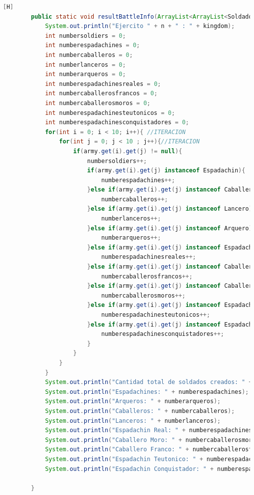 \documentclass{article}
\begin{document}
	\begin{lstlisting}[language=java,caption={Las lineas de codigos de la clase Mapa}][H]
		public static void resultBattleInfo(ArrayList<ArrayList<Soldado>> army, String kingdom, int n){
			System.out.println("Ejercito " + n + " : " + kingdom);
			int numbersoldiers = 0;
			int numberespadachines = 0;
			int numbercaballeros = 0;
			int numberlanceros = 0;
			int numberarqueros = 0;
			int numberespadachinesreales = 0;
			int numbercaballerosfrancos = 0;
			int numbercaballerosmoros = 0;
			int numberespadachinesteutonicos = 0;
			int numberespadachinesconquistadores = 0;
			for(int i = 0; i < 10; i++){ //ITERACION
				for(int j = 0; j < 10 ; j++){//ITERACION
					if(army.get(i).get(j) != null){
						numbersoldiers++;
						if(army.get(i).get(j) instanceof Espadachin){
							numberespadachines++;
						}else if(army.get(i).get(j) instanceof Caballero){
							numbercaballeros++;
						}else if(army.get(i).get(j) instanceof Lancero){
							numberlanceros++;
						}else if(army.get(i).get(j) instanceof Arquero){
							numberarqueros++;
						}else if(army.get(i).get(j) instanceof EspadachinReal){
							numberespadachinesreales++;
						}else if(army.get(i).get(j) instanceof CaballeroFranco){
							numbercaballerosfrancos++;
						}else if(army.get(i).get(j) instanceof CaballeroMoro){
							numbercaballerosmoros++;
						}else if(army.get(i).get(j) instanceof EspadachinTeutonico){
							numberespadachinesteutonicos++;
						}else if(army.get(i).get(j) instanceof EspadachinConquistador){
							numberespadachinesconquistadores++;
						}
					}
				}
			}
			System.out.println("Cantidad total de soldados creados: " + numbersoldiers);
			System.out.println("Espadachines: " + numberespadachines);
			System.out.println("Arqueros: " + numberarqueros);
			System.out.println("Caballeros: " + numbercaballeros);
			System.out.println("Lanceros: " + numberlanceros);
			System.out.println("Espadachin Real: " + numberespadachinesreales);
			System.out.println("Caballero Moro: " + numbercaballerosmoros);
			System.out.println("Caballero Franco: " + numbercaballerosfrancos);
			System.out.println("Espadachin Teutonico: " + numberespadachinesteutonicos);
			System.out.println("Espadachin Conquistador: " + numberespadachinesconquistadores + "\n");
	
		}
	\end{lstlisting}
\end{document}
